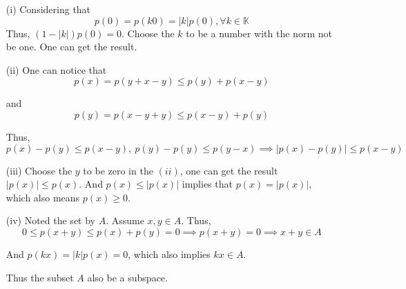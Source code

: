 \documentclass{article}
\begin{document}
\begin{enumerate}
\item[(i)] Considering that
\[p(0) = p(k0) = |k|p(0), \forall k \in \mathbb{K}\]
Thus, \((1 - |k|)p(0) = 0\). Choose the \(k\) to be a number with the norm not be one. One can get the result.

\item[(ii)] One can notice that 
\[p(x) = p(y + x - y) \le p(y) + p(x - y)\]
    
and 
\[p(y) = p(x - y + y) \le p(x - y) + p(y)\]

Thus, 
\[p(x) - p(y) \le p(x - y),\ p(y) - p(y) \le p(y - x) \implies |p(x) - p(y)| \le p(x - y)\]

\item[(iii)] Choose the \(y\) to be zero in the \((ii)\), one can get the result \(|p(x)| \le p(x)\). And \(p(x) \le |p(x)|\) implies that \(p(x) = |p(x)|\), which also means \(p(x) \ge 0\).

\item[(iv)] Noted the set by \(A\). Assume \(x, y \in A\). Thus,
\[0 \le p(x + y) \le p(x) + p(y) = 0 \implies p(x + y) = 0 \implies x + y \in A\]

And \(p(kx) = |k|p(x) = 0\), which also implies \(kx \in A\).

Thus the subset \(A\) also be a subspace.


\end{enumerate}
\end{document}
